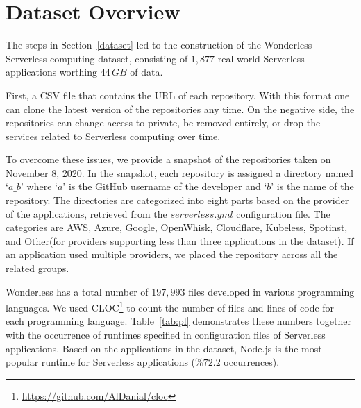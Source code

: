 
\section{Dataset Overview}
\label{schema}

The steps in Section~\ref{dataset} led to the construction of the 
Wonderless Serverless computing dataset, consisting of $1,877$
real-world Serverless applications worthing $44 \, GB$ of data. 

First, a CSV file that contains the URL of each repository. 
With this format one can clone the latest version of the repositories any time. 
On the negative side, the repositories can change access to private, 
be removed entirely, or drop the services related to Serverless computing 
over time. 

To overcome these issues, we provide a snapshot of the 
repositories taken on November 8, 2020. 
In the snapshot, each repository is assigned a directory named `$a\_b$' 
where `$a$' is the GitHub username of the developer and `$b$' is the name of the repository. 
The directories are categorized into eight parts based on the provider of the applications, 
retrieved from the $serverless.yml$ configuration file. 
The categories are AWS, Azure, Google, OpenWhisk, Cloudflare, Kubeless, 
Spotinst, and Other(for providers supporting less than three applications in the dataset).
If an application used multiple providers, we placed the repository across 
all the related groups. 

Wonderless has a total number of $197,993$ files developed in various programming languages. 
We used CLOC\footnote{\url{https://github.com/AlDanial/cloc}} to count the number of files and 
lines of code for each programming language. Table~\ref{tab:pl} demonstrates these numbers 
together with the occurrence of runtimes specified in configuration files of Serverless applications. 
Based on the applications in the dataset, Node.js is the most popular runtime 
for Serverless applications ($\%72.2$ occurrences).

